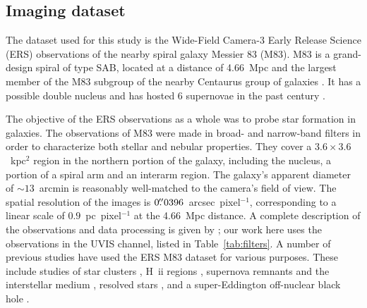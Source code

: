 
\subsection{Imaging dataset}
The dataset used for this study is the Wide-Field Camera-3
Early Release Science (ERS) observations of the nearby spiral galaxy Messier 83 (M83).
M83 is a grand-design spiral of type SAB, located at a distance of 4.66~Mpc \citep{tully13}
and the largest member of the M83 subgroup of the nearby Centaurus group of galaxies \citep{tully15}.
It has a possible double nucleus \citep{mast06,thatte00} and has hosted 6 supernovae in the past century \citep{stockdale06}.

The objective of the ERS observations as a whole was to probe star formation in galaxies.
The observations of M83 were made in broad- and narrow-band filters in order to characterize both stellar and nebular properties.
They cover a $3.6\times3.6$~kpc$^2$ region in the northern portion of the galaxy, including the nucleus,
a portion of a spiral arm and an interarm region.
The galaxy's apparent diameter of $\sim13$~arcmin \citep{rc3} is reasonably well-matched to the camera's field of view.
The spatial resolution of the images is $0\hbox{$.\!\!^{\prime\prime}$}0396$~arcsec~pixel$^{-1}$,
corresponding to a linear scale of $0.9$~pc~pixel$^{-1}$ at the 4.66~Mpc distance.
A complete description of the observations and data processing is given by \citet{chandar10};
our work here uses the observations in the UVIS channel, listed in Table~\ref{tab:filters}.
A number of previous studies have used the ERS M83 dataset for various purposes.
These include studies of 
star clusters \citep{chandar10, wofford11, whitmore11, bastian11, bastian12, fouesneau12, silva13, andrews14, chandar14, adamo15,ryon15,hollyhead15, sun16},
H~{\sc ii} regions \citep{liu13}, supernova remnants and the interstellar medium \citep{dopita10, hong11, blair14, blair15}, 
resolved stars \citep{kim12, williams15},
and a super-Eddington off-nuclear black hole \citep{soria14}.


